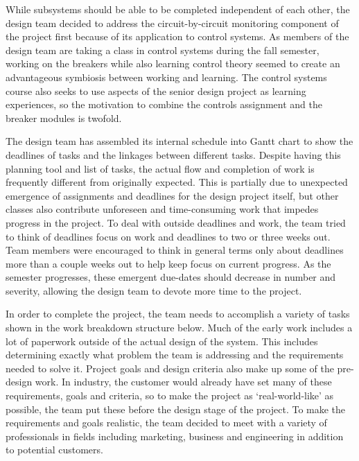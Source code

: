 


While subsystems should be able to be completed independent of each other, the design team decided to address the circuit-by-circuit monitoring component of the project first because of its application to control systems. As members of the design team are taking a class in control systems during the fall semester, working on the breakers while also learning control theory seemed to create an advantageous symbiosis between working and learning. The control systems course also seeks to use aspects of the senior design project as learning experiences, so the motivation to combine the controls assignment and the breaker modules is twofold.

The design team has assembled its internal schedule into Gantt chart to show the deadlines of tasks and the linkages between different tasks. Despite having this planning tool and list of tasks, the actual flow and completion of work is frequently different from originally expected. This is partially due to unexpected emergence of assignments and deadlines for the design project itself, but other classes also contribute unforeseen and time-consuming work that impedes progress in the project. To deal with outside deadlines and work, the team tried to think of deadlines focus on work and deadlines to two or three weeks out. Team members were encouraged to think in general terms only about deadlines more than a couple weeks out to help keep focus on current progress. As the semester progresses, these emergent due-dates should decrease in number and severity, allowing the design team to devote more time to the project.

In order to complete the project, the team needs to accomplish a variety of tasks shown in the work breakdown structure below. Much of the early work includes a lot of paperwork outside of the actual design of the system. This includes determining exactly what problem the team is addressing and the requirements needed to solve it. Project goals and design criteria also make up some of the pre-design work. In industry, the customer would already have set many of these requirements, goals and criteria, so to make the project as `real-world-like' as possible, the team put these before the design stage of the project. To make the requirements and goals realistic, the team decided to meet with a variety of professionals in fields including marketing, business and engineering in addition to potential customers. 

